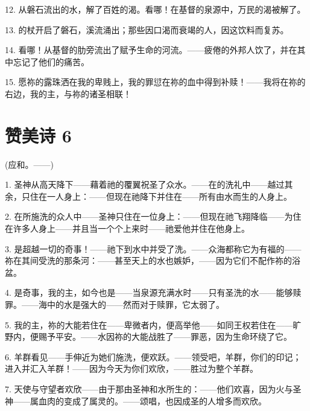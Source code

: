 12. 从磐石流出的水，解了百姓的渴。看哪！在基督的泉源中，万民的渴被解了。\par

13. 的杖开启了磐石，溪流涌出；那些因口渴而衰竭的人，因这饮料而复苏。\par

14. 看哪！从基督的肋旁流出了赋予生命的河流。——疲倦的外邦人饮了，并在其中忘记了他们的痛苦。\par

15. 愿祢的露珠洒在我的卑贱上，我的罪愆在祢的血中得到补赎！——我将在祢的右边，我的主，与祢的诸圣相联！\par


\section{赞美诗 6}

(应和。——)\par

1. 圣神从高天降下——藉着祂的覆翼祝圣了众水。——在的洗礼中——越过其余，只住在一人身上：——但现在祂降下并住在——所有由水而生的人身上。\par

2. 在所施洗的众人中——圣神只住在一位身上：——但现在祂飞翔降临——为住在许多人身上——并且当一个个上来时——祂爱他并住在他身上。\par

3. 是超越一切的奇事！——祂下到水中并受了洗。——众海都称它为有福的——祢在其间受洗的那条河：——甚至天上的水也嫉妒，——因为它们不配作祢的浴盆。\par

4. 是奇事，我的主，如今也是——当泉源充满水时——只有圣洗的水——能够赎罪。——海中的水是强大的——然而对于赎罪，它太弱了。\par

5. 我的主，祢的大能若住在——卑微者内，便高举他——如同王权若住在——旷野内，便赐予平安。——水因祢的大能战胜了——罪恶，因为生命环绕了它。\par

6. 羊群看见——手伸近为她们施洗，便欢跃。——领受吧，羊群，你们的印记；进入并汇入羊群！——因为今天为你们欢欣，——胜过为整个羊群。\par

7. 天使与守望者欢欣——由于那由圣神和水所生的：——他们欢喜，因为火与圣神——属血肉的变成了属灵的。——颂唱，也因成圣的人增多而欢欣。\par

